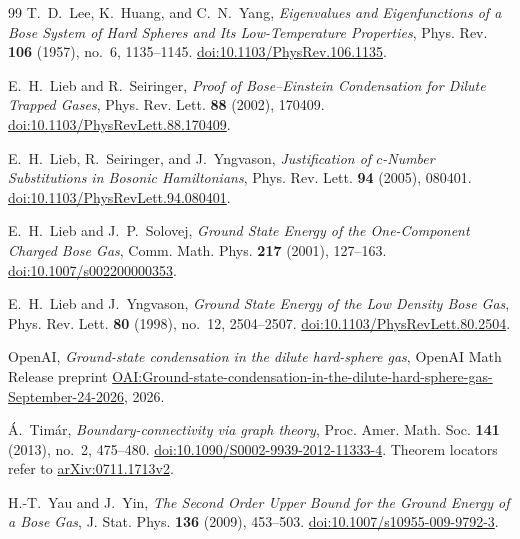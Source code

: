 \begin{thebibliography}{99}
T.~D.~Lee, K.~Huang, and C.~N.~Yang,
\emph{Eigenvalues and Eigenfunctions of a Bose System of Hard Spheres
and Its Low-Temperature Properties},
Phys. Rev. \textbf{106} (1957), no.~6, 1135--1145.
\href{https://doi.org/10.1103/PhysRev.106.1135}{doi:10.1103/PhysRev.106.1135}.

E.~H.~Lieb and R.~Seiringer,
\emph{Proof of Bose--Einstein Condensation for Dilute Trapped Gases},
Phys. Rev. Lett. \textbf{88} (2002), 170409.
\href{https://doi.org/10.1103/PhysRevLett.88.170409}{doi:10.1103/PhysRevLett.88.170409}.

E.~H.~Lieb, R.~Seiringer, and J.~Yngvason,
\emph{Justification of $c$-Number Substitutions in Bosonic Hamiltonians},
Phys. Rev. Lett. \textbf{94} (2005), 080401.
\href{https://doi.org/10.1103/PhysRevLett.94.080401}{doi:10.1103/PhysRevLett.94.080401}.

E.~H.~Lieb and J.~P.~Solovej,
\emph{Ground State Energy of the One-Component Charged Bose Gas},
Comm. Math. Phys. \textbf{217} (2001), 127--163.
\href{https://doi.org/10.1007/s002200000353}{doi:10.1007/s002200000353}.

E.~H.~Lieb and J.~Yngvason,
\emph{Ground State Energy of the Low Density Bose Gas},
Phys. Rev. Lett. \textbf{80} (1998), no.~12, 2504--2507.
\href{https://doi.org/10.1103/PhysRevLett.80.2504}{doi:10.1103/PhysRevLett.80.2504}.

OpenAI,
\emph{Ground-state condensation in the dilute hard-sphere gas},
OpenAI Math Release preprint
\href{https://github.com/openai/math/blob/main/preprints/Ground-state-condensation-in-the-dilute-hard-sphere-gas-September-24-2026/paper.pdf}{OAI:Ground-state-condensation-in-the-dilute-hard-sphere-gas-September-24-2026},
2026.

\'A.~Tim\'ar,
\emph{Boundary-connectivity via graph theory},
Proc. Amer. Math. Soc. \textbf{141} (2013), no.~2, 475--480.
\href{https://doi.org/10.1090/S0002-9939-2012-11333-4}{doi:10.1090/S0002-9939-2012-11333-4}.
Theorem locators refer to
\href{https://arxiv.org/abs/0711.1713v2}{arXiv:0711.1713v2}.

H.-T.~Yau and J.~Yin,
\emph{The Second Order Upper Bound for the Ground Energy of a Bose Gas},
J. Stat. Phys. \textbf{136} (2009), 453--503.
\href{https://doi.org/10.1007/s10955-009-9792-3}{doi:10.1007/s10955-009-9792-3}.

\end{thebibliography}
